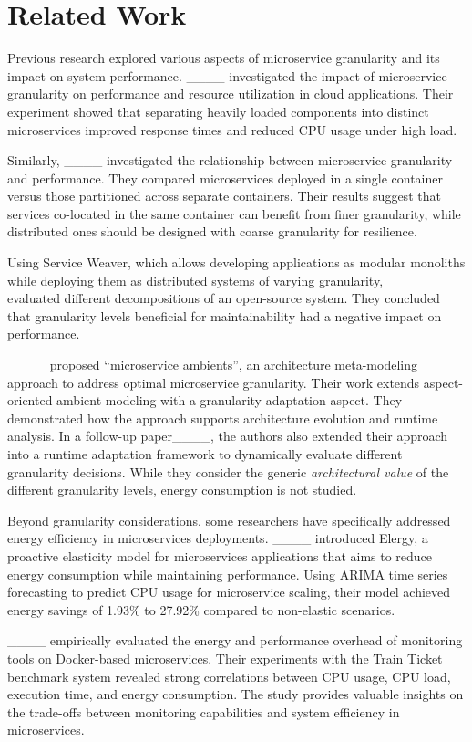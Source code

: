 \section{Related Work}
Previous research explored various aspects of microservice granularity and its impact on system performance.
____ investigated the impact of microservice granularity on performance and resource utilization in cloud applications.
Their experiment showed that separating heavily loaded components into distinct microservices improved response times and reduced CPU usage under high load.

Similarly, ____ investigated the relationship between microservice granularity and performance.
They compared microservices deployed in a single container versus those partitioned across separate containers.
Their results suggest that services co-located in the same container can benefit from finer granularity, while distributed ones should be designed with coarse granularity for resilience.

Using Service Weaver, which allows developing applications as modular monoliths while deploying them as distributed systems of varying granularity, ____ evaluated different decompositions of an open-source system.
They concluded that granularity levels beneficial for maintainability had a negative impact on performance.

____ proposed \enquote{microservice ambients}, an architecture meta-modeling approach to address optimal microservice granularity.
Their work extends aspect-oriented ambient modeling with a granularity adaptation aspect.
They demonstrated how the approach supports architecture evolution and runtime analysis.
In a follow-up paper____, the authors also extended their approach into a runtime adaptation framework to dynamically evaluate different granularity decisions.
While they consider the generic \textit{architectural value} of the different granularity levels, energy consumption is not studied.

Beyond granularity considerations, some researchers have specifically addressed energy efficiency in microservices deployments.
____ introduced Elergy, a proactive elasticity model for microservices applications that aims to reduce energy consumption while maintaining performance.
Using ARIMA time series forecasting to predict CPU usage for microservice scaling, their model achieved energy savings of 1.93\% to 27.92\% compared to non-elastic scenarios.

____ empirically evaluated the energy and performance overhead of monitoring tools on Docker-based microservices.
Their experiments with the Train Ticket benchmark system revealed strong correlations between CPU usage, CPU load, execution time, and energy consumption.
The study provides valuable insights on the trade-offs between monitoring capabilities and system efficiency in microservices.

